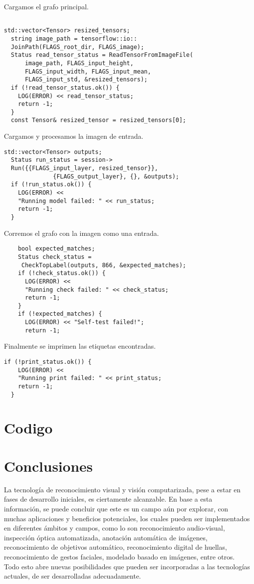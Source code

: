 \documentclass[11pt]{article}
\begin{document}
Cargamos el grafo principal.
\begin{lstlisting}

std::vector<Tensor> resized_tensors;
  string image_path = tensorflow::io::
  JoinPath(FLAGS_root_dir, FLAGS_image);
  Status read_tensor_status = ReadTensorFromImageFile(
      image_path, FLAGS_input_height, 
      FLAGS_input_width, FLAGS_input_mean,
      FLAGS_input_std, &resized_tensors);
  if (!read_tensor_status.ok()) {
    LOG(ERROR) << read_tensor_status;
    return -1;
  }
  const Tensor& resized_tensor = resized_tensors[0];
\end{lstlisting}

Cargamos y procesamos la imagen de entrada.

\begin{lstlisting}
std::vector<Tensor> outputs;
  Status run_status = session->
  Run({{FLAGS_input_layer, resized_tensor}},
              {FLAGS_output_layer}, {}, &outputs);
  if (!run_status.ok()) {
    LOG(ERROR) << 
    "Running model failed: " << run_status;
    return -1;
  }

\end{lstlisting}
Corremos el grafo con la imagen como una entrada.

\begin{lstlisting}
    bool expected_matches;
    Status check_status = 
     CheckTopLabel(outputs, 866, &expected_matches);
    if (!check_status.ok()) {
      LOG(ERROR) << 
      "Running check failed: " << check_status;
      return -1;
    }
    if (!expected_matches) {
      LOG(ERROR) << "Self-test failed!";
      return -1;

\end{lstlisting}

Finalmente se imprimen las etiquetas encontradas.
\begin{lstlisting}
if (!print_status.ok()) {
    LOG(ERROR) << 
    "Running print failed: " << print_status;
    return -1;
  }

\end{lstlisting}

\newpage

\section{Codigo}

\newpage
\section{Conclusiones}
La tecnología de reconocimiento visual y visión computarizada, pese a estar en fases de desarrollo iniciales, es ciertamente alcanzable. En base a esta información, se puede concluir que este es un campo aún por explorar, con muchas aplicaciones y beneficios potenciales, los cuales pueden ser implementados en diferentes ámbitos y campos, como lo son reconocimiento audio-visual, inspección óptica automatizada, anotación automática de imágenes, reconocimiento de objetivos automático, reconocimiento digital de huellas, reconocimiento de gestos faciales, modelado basado en imágenes, entre otros. Todo esto abre nuevas posibilidades que pueden ser incorporadas a las tecnologías actuales, de ser desarrolladas adecuadamente.
\end{document}
